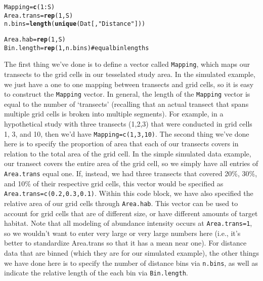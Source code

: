 \documentclass{article}\usepackage{graphicx, color}
\makeatletter
\newcommand{\hlfunctioncall}[1]{\textcolor[rgb]{0.501960784313725,0,0.329411764705882}{\textbf{#1}}}%
\newcommand{\hlstring}[1]{\textcolor[rgb]{0.6,0.6,1}{#1}}%
\newcommand{\hlcomment}[1]{\textcolor[rgb]{0.180392156862745,0.6,0.341176470588235}{#1}}%
\newenvironment{kframe}{%
 \def\at@end@of@kframe{}%
 \ifinner\ifhmode%
  \def\at@end@of@kframe{\end{minipage}}%
  \begin{minipage}{\columnwidth}%
 \fi\fi%
 \def\FrameCommand##1{\hskip\@totalleftmargin \hskip-\fboxsep
 \colorbox{shadecolor}{##1}\hskip-\fboxsep
     \hskip-\linewidth \hskip-\@totalleftmargin \hskip\columnwidth}%
 \MakeFramed {\advance\hsize-\width
   \@totalleftmargin\z@ \linewidth\hsize
   \@setminipage}}%
 {\par\unskip\endMakeFramed%
 \at@end@of@kframe}
\newenvironment{knitrout}{}{} %
\makeatother
\begin{document}
\begin{knitrout}
\color{fgcolor}\begin{kframe}
\begin{alltt}
Mapping = \hlfunctioncall{c}(1:S)
Area.trans = \hlfunctioncall{rep}(1, S)
n.bins = \hlfunctioncall{length}(\hlfunctioncall{unique}(Dat[, \hlstring{"Distance"}]))
\end{alltt}


{\ttfamily\noindent\bfseries\color{errorcolor}{\#\# Error: object 'Dat' not found}}\begin{alltt}
Area.hab = \hlfunctioncall{rep}(1, S)
Bin.length = \hlfunctioncall{rep}(1, n.bins)  \hlcomment{#equal bin lengths}
\end{alltt}


{\ttfamily\noindent\bfseries\color{errorcolor}{\#\# Error: object 'n.bins' not found}}\end{kframe}
\end{knitrout}


The first thing we've done is to define a vector called \texttt{Mapping}, which
maps our transects to the grid cells in our tesselated study area.  In the simulated
example, we just have a one to one mapping between transects and grid cells, so
it is easy to construct the \texttt{Mapping} vector.  In general, the length of the \texttt{Mapping} vector is equal to the number of `transects' (recalling that an actual transect that spans multiple grid cells is broken into multiple segments).  For example, in a hypothetical study with three transects (1,2,3) that were conducted in grid cells 1, 3, and 10, then we'd have \texttt{Mapping=c(1,3,10)}.
The second thing we've done here is to specify the proportion of area that each of our transects covers in relation to the total area of the grid cell.  In the simple simulated data example, our transect covers the entire area of the grid cell, so we simply have all entries of \texttt{Area.trans} equal one.  If, instead, we had three transects that covered 20\%, 30\%, and 10\% of their respective grid cells, this vector would be specified as \texttt{Area.trans=c(0.2,0.3,0.1)}.  Within this code block, we have also specified the relative area of our grid cells through \texttt{Area.hab}.  This vector can be used to account for grid cells that are of different size, or have different amounts of target habitat.  Note that all modeling of abundance intensity occurs at \texttt{Area.trans=1}, so we wouldn't want to enter very large or very large numbers here (i.e., it's better to standardize Area.trans so that it has a mean near one).  For distance data that are binned (which they are for our simulated example), the other things we have done here is to specify the number of distance bins via \texttt{n.bins}, as well as indicate the relative length of the each bin via \texttt{Bin.length}.    
\end{document}
